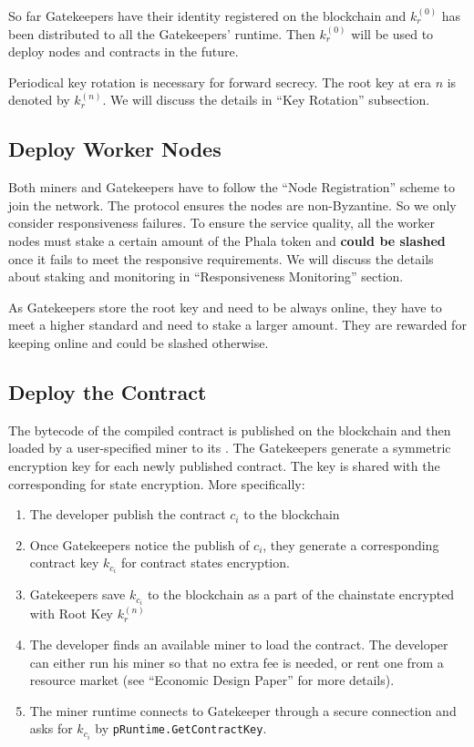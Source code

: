 So far Gatekeepers have their identity registered on the blockchain and $k_r^{(0)}$ has been distributed to all the Gatekeepers' runtime. Then $k_r^{(0)}$ will be used to deploy nodes and contracts in the future.

Periodical key rotation is necessary for forward secrecy. The root key at era $n$ is denoted by $k_r^{(n)}$. We will discuss the details in ``Key Rotation'' subsection.



\subsection{Deploy Worker Nodes}

Both miners and Gatekeepers have to follow the ``Node Registration'' scheme to join the network. The protocol ensures the nodes are non-Byzantine. So we only consider responsiveness failures. To ensure the service quality, all the worker nodes must stake a certain amount of the Phala token and \textbf{could be slashed} once it fails to meet the responsive requirements. We will discuss the details about staking and monitoring in ``Responsiveness Monitoring'' section.

As Gatekeepers store the root key and need to be always online, they have to meet a higher standard and need to stake a larger amount. They are rewarded for keeping online and could be slashed otherwise.



\subsection{Deploy the Contract}

The bytecode of the compiled contract is published on the blockchain and then loaded by a user-specified miner to its \pruntime. The Gatekeepers generate a symmetric encryption key for each newly published contract. The key is shared with the corresponding \pruntime for state encryption. More specifically:

\begin{enumerate}
    \item The developer publish the contract $c_i$ to the blockchain
    \item Once Gatekeepers notice the publish of $c_i$, they generate a corresponding contract key $k_{c_i}$ for contract states encryption. 
    \item Gatekeepers save $k_{c_i}$ to the blockchain as a part of the chainstate encrypted with Root Key $k_r^{(n)}$
    \item The developer finds an available miner to load the contract. The developer can either run his miner so that no extra fee is needed, or rent one from a resource market (see ``Economic Design Paper'' for more details).
    \item The miner runtime connects to Gatekeeper through a secure connection and asks for $k_{c_i}$ by \texttt{pRuntime.GetContractKey}.
\end{enumerate}

